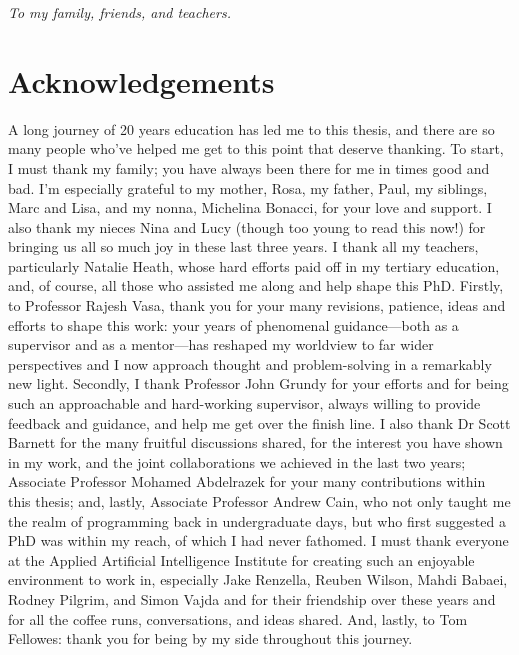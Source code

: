 \cleardoublepage
\pagestyle{empty}
\begin{center}
  \vspace*{0.3\paperheight}
  \textit{To my family, friends, and teachers.}
\end{center}
\pagestyle{fancy}

\chapter*{Acknowledgements}

\vspace{-2\bigskipamount}

A long journey of 20 years education has led me to this thesis, and there are so many people who've helped me get to this point that deserve thanking. To start, I must thank my family; you have always been there for me in times good and bad. I'm especially grateful to my mother, Rosa, my father, Paul, my siblings, Marc and Lisa, and my nonna, Michelina Bonacci, for your love and support. I also thank my nieces Nina and Lucy (though too young to read this now!) for bringing us all so much joy in these last three years. I thank all my teachers, particularly Natalie Heath, whose hard efforts paid off in my tertiary education, and, of course, all those who assisted me along and help shape this PhD. Firstly, to Professor Rajesh Vasa, thank you for your many revisions, patience, ideas and efforts to shape this work: your years of phenomenal guidance---both as a supervisor and as a mentor---has reshaped my worldview to far wider perspectives and I now approach thought and problem-solving in a remarkably new light. Secondly, I thank Professor John Grundy for your efforts and for being such an approachable and hard-working supervisor, always willing to provide feedback and guidance, and help me get over the finish line. I also thank Dr Scott Barnett for the many fruitful discussions shared, for the interest you have shown in my work, and the joint collaborations we achieved in the last two years; Associate Professor Mohamed Abdelrazek for your many contributions within this thesis; and, lastly, Associate Professor Andrew Cain, who not only taught me the realm of programming back in undergraduate days, but who first suggested a PhD was within my reach, of which I had never fathomed. I must thank everyone at the Applied Artificial Intelligence Institute for creating such an enjoyable environment to work in, especially Jake Renzella,  Reuben Wilson, Mahdi Babaei, Rodney Pilgrim, and Simon Vajda and for their friendship over these years and for all the coffee runs, conversations, and ideas shared. And, lastly, to Tom Fellowes: thank you for being by my side throughout this journey. 

